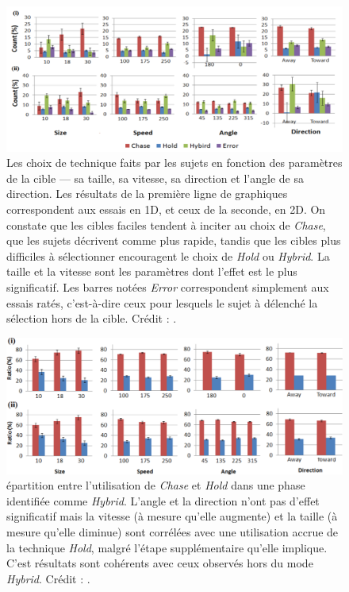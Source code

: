 \begin{appendices}
	\begin{figure}[htbp]
		\centering
		\includegraphics[width=\textwidth]{figures/ch2/holdTech}
		\caption[\emph{Hold} -- choix de la technique]{Les choix de technique faits par les sujets en fonction des paramètres de la cible --- sa taille, sa vitesse, sa direction et l'angle de sa direction. Les résultats de la première ligne de graphiques correspondent aux essais en 1D, et ceux de la seconde, en 2D. On constate que les cibles \og faciles \fg{}  tendent à inciter au choix de \emph{Chase}, que les sujets décrivent comme plus rapide, tandis que les cibles plus difficiles à sélectionner encouragent le choix de \emph{Hold} ou \emph{Hybrid}. La taille et la vitesse sont les paramètres dont l'effet est le plus significatif. Les barres notées \emph{Error} correspondent simplement aux essais ratés, c'est-à-dire ceux pour lesquels le sujet à délenché la sélection hors de la cible. Crédit : \cite{hajri2011moving}.}
		\label{fig:holdTech}
	\end{figure}
	
	\begin{figure}[htbp]
		\centering
		\includegraphics[width=\textwidth]{figures/ch2/holdRatio}
		\caption[\emph{Hold} -- répartition \emph{Hold/Chase} en mode \emph{Hybrid}]{épartition entre l'utilisation de \emph{Chase} et \emph{Hold} dans une phase identifiée comme \emph{Hybrid}. L'angle et la direction n'ont pas d'effet significatif mais la vitesse (à mesure qu'elle augmente) et la taille (à mesure qu'elle diminue) sont corrélées avec une utilisation accrue de la technique \emph{Hold}, malgré l'étape supplémentaire qu'elle implique. C'est résultats sont cohérents avec ceux observés hors du mode \emph{Hybrid}. Crédit : \cite{hajri2011moving}.}
		\label{fig:holdRatio}
	\end{figure}

















\end{appendices}
